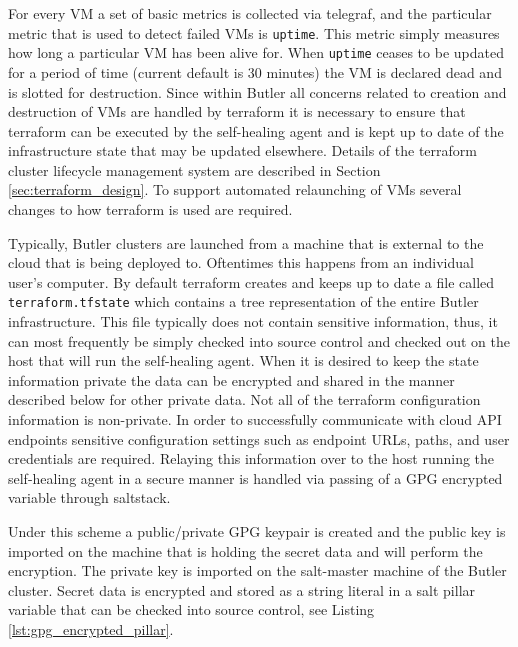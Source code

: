 For every VM a set of basic metrics is collected via telegraf, and the particular metric that is used to detect failed VMs is \texttt{uptime}. This metric simply measures how long a particular VM has been alive for. When \texttt{uptime} ceases to be updated for a period of time (current default is 30 minutes) the VM is declared dead and is slotted for destruction. Since within Butler all concerns related to creation and destruction of VMs are handled by terraform it is necessary to ensure that terraform can be executed by the self-healing agent and is kept up to date of the infrastructure state that may be updated elsewhere. Details of the terraform cluster lifecycle management system are described in Section \ref{sec:terraform_design}. To support automated relaunching of VMs several changes to how terraform is used are required. 

Typically, Butler clusters are launched from a machine that is external to the cloud that is being deployed to. Oftentimes this happens from an individual user's computer. By default terraform creates and keeps up to date a file called \texttt{terraform.tfstate} which contains a tree representation of the entire Butler infrastructure. This file typically does not contain sensitive information, thus, it can most frequently be simply checked into source control and checked out on the host that will run the self-healing agent. When it is desired to keep the state information private the data can be encrypted and shared in the manner described below for other private data. Not all of the terraform configuration information is non-private. In order to successfully communicate with cloud API endpoints sensitive configuration settings such as endpoint URLs, paths, and user credentials are required. Relaying this information over to the host running the self-healing agent in a secure manner is handled via passing of a GPG encrypted variable through saltstack.

Under this scheme a public/private GPG keypair is created and the public key is imported on the machine that is holding the secret data and will perform the encryption. The private key is imported on the salt-master machine of the Butler cluster. Secret data is encrypted and stored as a string literal in a salt pillar variable that can be checked into source control, see Listing \ref{lst:gpg_encrypted_pillar}.

